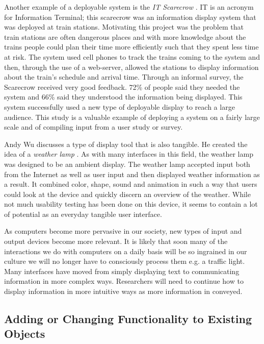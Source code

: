 Another example of a deployable system is the \emph{IT Scarecrow} \cite{1358645}.  IT is an acronym for Information Terminal; this scarecrow was an information display system that was deployed at train stations.  Motivating this project was the problem that train stations are often dangerous places and with more knowledge about the trains people could plan their time more efficiently such that they spent less time at risk.  The system used cell phones to track the trains coming to the system and then, through the use of a web-server, allowed the stations to display information about the train's schedule and arrival time.  Through an informal survey, the Scarecrow received very good feedback.  72\% of people said they needed the system and 66\% said they understood the information being displayed.  This system successfully used a new type of deployable display to reach a large audience.  This study is a valuable example of deploying a system on a fairly large scale and of compiling input from a user study or survey.

Andy Wu discusses a type of display tool that is also tangible.  He created the idea of a \emph{weather lamp} \cite{1709961}.  As with many interfaces in this field, the weather lamp was designed to be an ambient display. The weather lamp accepted input both from the Internet as well as user input and then displayed weather information as a result.  It combined color, shape, sound and animation in such a way that users could look at the device and quickly discern an overview of the weather.  While not much usability testing has been done on this device, it seems to contain a lot of potential as an everyday tangible user interface. 

As computers become more pervasive in our society, new types of input and output devices become more relevant.  It is likely that soon many of the interactions we do with computers on a daily basis will be so ingrained in our culture we will no longer have to consciously process them e.g. a traffic light.  Many interfaces have moved from simply displaying text to communicating information in more complex ways.  Researchers will need to continue how to display information in more intuitive ways as more information in conveyed.

\subsection{Adding or Changing Functionality to Existing Objects}
 
